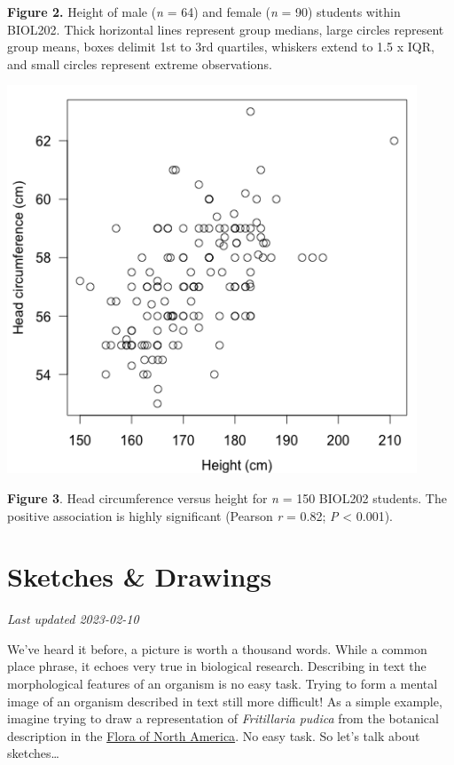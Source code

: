 \documentclass[
]{book}
\begin{document}
\textbf{Figure 2.} Height of male (\emph{n} = 64) and female (\emph{n} = 90) students within BIOL202. Thick horizontal lines represent group medians, large circles represent group means, boxes delimit 1st to 3rd quartiles, whiskers extend to 1.5 x IQR, and small circles represent extreme observations.

\includegraphics{images/FT_fig-3.png}

\textbf{Figure 3}. Head circumference versus height for \emph{n} = 150 BIOL202 students. The positive association is highly significant (Pearson \emph{r} = 0.82; \emph{P} \textless{} 0.001).

\hypertarget{sketches-drawings}{%
\chapter{Sketches \& Drawings}\label{sketches-drawings}}

\emph{Last updated 2023-02-10}

We've heard it before, a picture is worth a thousand words. While a common place phrase, it echoes very true in biological research. Describing in text the morphological features of an organism is no easy task. Trying to form a mental image of an organism described in text still more difficult! As a simple example, imagine trying to draw a representation of \emph{Fritillaria pudica} from the botanical description in the \href{http://www.efloras.org/florataxon.aspx?flora_id=1\&taxon_id=242101628}{Flora of North America}. No easy task. So let's talk about sketches\ldots{}
\end{document}
